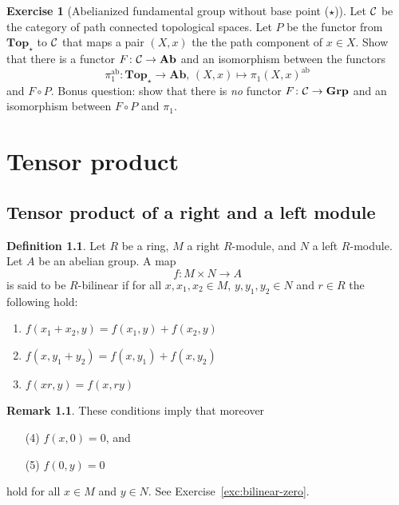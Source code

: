 \documentclass[11pt]{amsbook}
\renewcommand{\ast}{\star}
\def\ab{\mathrm{ab}}
\def\Ab{\mathbf{Ab}}
\def\Top{\mathbf{Top}}
\def\Grp{\mathbf{Grp}}
\theoremstyle{plain}
\theoremstyle{definition}
\newtheorem{definition}[theorem]{Definition}
\newtheorem{remark}[theorem]{Remark}
\newtheorem{exercise}{Exercise}
\begin{document}
\begin{exercise}[Abelianized fundamental group without base point ($\star$)]
Let ${\mathcal{C}}$ be the category of path connected topological spaces. Let $P$ be the functor
from $\Top_\ast$ to ${\mathcal{C}}$ that maps a pair $(X,x)$ the the path component of $x\in X$.
Show that there is a functor $F\colon \cC \to \Ab$
and an isomorphism between the functors
\[
	\pi_1^\ab \colon \Top_\ast \to \Ab,\, (X,x) \mapsto \pi_1(X,x)^\ab
\]
and $F\circ P$. Bonus question: show that there is \emph{no} functor $F\colon \cC \to \Grp$ and 
an isomorphism between $F\circ P$ and $\pi_1$.
\end{exercise}







\chapter{Tensor product}


\section{Tensor product of a right and a left module}

\begin{definition}
Let $R$ be a  ring, $M$ a right $R$-module, and $N$ a left $R$-module. Let $A$ be an abelian group. A map
\[
	f\colon M\times N \to A
\]
is said to be $R$-bilinear if for all $x, x_1,x_2\in M$, $y, y_1,y_2\in N$ and $r\in R$ the following hold:
\begin{enumerate}
\item $f(x_1+x_2,y)=f(x_1,y) + f(x_2,y)$
\item $f(x,y_1+y_2) = f(x,y_1) + f(x,y_2)$
\item $f(xr,y)=f(x,ry)$ 
\end{enumerate}
\end{definition}

\begin{remark}
These conditions imply that moreover
\begin{enumerate}
\item [(4)] $f(x,0)=0$, and
\item[(5)] $f(0,y) =0$
\end{enumerate}
hold for all $x\in M$ and $y\in N$. See Exercise~\ref{exc:bilinear-zero}.
\end{remark}
\end{document}
